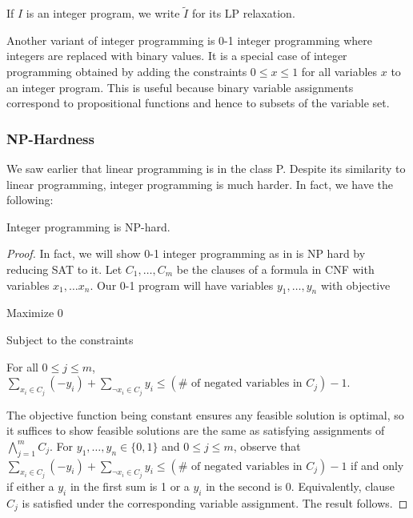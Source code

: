\begin{notation}
    If $I$ is an integer program, we write $\tilde{I}$ for its LP relaxation.
\end{notation}

\begin{example}\label{0-1}
Another variant of integer programming is 0-1 integer programming where integers are replaced with binary values.
It is a special case of integer programming obtained by adding the constraints $0 \leq x \leq 1$ for all variables $x$ to an integer program.
This is useful because binary variable assignments correspond to propositional functions and hence to subsets of the variable set.
\end{example}

\subsubsection{NP-Hardness}\label{IPisNPhard}

We saw earlier that linear programming is in the class P.
Despite its similarity to linear programming, integer programming is much harder.
In fact, we have the following:

\begin{theorem}\label{nphard}\cite{karp21}
    Integer programming is NP-hard.
\end{theorem}

\begin{proof}
In fact, we will show 0-1 integer programming as in  is NP hard by reducing SAT to it.
Let $C_{1}, \ldots, C_{m}$ be the clauses of a formula in CNF with variables $x_{1}, \ldots x_{n}$. 
Our 0-1 program will have variables $y_{1}, \ldots, y_{n}$ with objective
    
\begin{center}
Maximize $0$

Subject to the constraints

For all $0 \leq j \leq m$, $\sum_{x_{i} \in C_{j}} (-y_{i}) + \sum_{\neg x_{i} \in C_{j}} y_{i} \leq (\#\text{ of negated variables in } C_{j}) - 1$.

\end{center}

The objective function being constant ensures any feasible solution is optimal, so it suffices to show feasible solutions are the same as satisfying assignments of $\bigwedge_{j = 1}^{m}C_{j}$.
For $y_{1}, \ldots, y_{n} \in \{0, 1\}$ and $0 \leq j \leq m$, observe that $\sum_{x_{i} \in C_{j}} (-y_{i}) + \sum_{\neg x_{i} \in C_{j}} y_{i} \leq (\#\text{ of negated variables in } C_{j}) - 1$ if and only if either a $y_{i}$ in the first sum is 1 or a $y_{i}$ in the second is 0.
Equivalently, clause $C_{j}$ is satisfied under the corresponding variable assignment. The result follows.
\end{proof}

